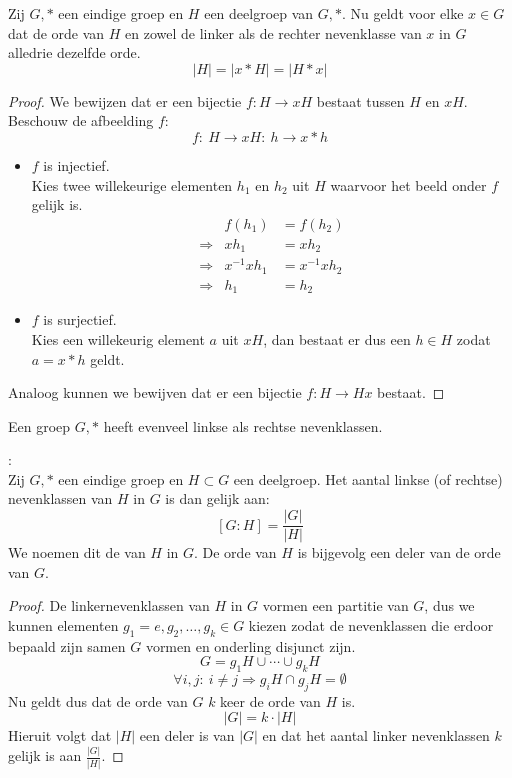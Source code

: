 \documentclass[main.tex]{subfiles}
\begin{document}
\begin{st}
  \label{st:nevenklassen-zelfde-orde}
  Zij $G,*$ een eindige groep en $H$ een deelgroep van $G,*$. Nu geldt voor elke $x\in G$ dat de orde van $H$ en zowel de linker als de rechter nevenklasse van $x$ in $G$ alledrie dezelfde orde.
  \[ |H| = |x*H| = |H*x| \]

  \begin{proof}
    We bewijzen dat er een bijectie $f: H \rightarrow xH$ bestaat tussen $H$ en $xH$.
    Beschouw de afbeelding $f$:
    \[ f:\ H\rightarrow xH:\ h \rightarrow x*h \]
    \begin{itemize}
    \item $f$ is injectief.\\
      Kies twee willekeurige elementen $h_{1}$ en $h_{2}$ uit $H$ waarvoor het beeld onder $f$ gelijk is.
      \[ 
      \begin{array}{rrl}
                  & f(h_{1})    &= f(h_{2})   \\ 
      \Rightarrow & xh_{1}      &= xh_{2}     \\
      \Rightarrow & x^{-1}xh_{1} &= x^{-1}xh_{2}\\
      \Rightarrow & h_{1}       &= h_{2}
      \end{array}
      \]
    \item $f$ is surjectief.\\
      Kies een willekeurig element $a$ uit $xH$, dan bestaat er dus een $h \in H$ zodat $a = x*h$ geldt.
    \end{itemize}
    Analoog kunnen we bewijven dat er een bijectie $f: H \rightarrow Hx$ bestaat.
  \end{proof}
\end{st}

\begin{st}
  Een groep $G,*$ heeft evenveel linkse als rechtse nevenklassen.

\end{st}

\begin{st}
  \label{st:stelling-van-lagrange}
  :\\
  Zij $G,*$ een eindige groep en $H \subset G$ een deelgroep. Het aantal linkse (of rechtse) nevenklassen van $H$ in $G$ is dan gelijk aan:
  \[ [G:H] = \frac{|G|}{|H|} \]
  We noemen dit de  van $H$ in $G$.
  De orde van $H$ is bijgevolg een deler van de orde van $G$.

  \begin{proof}
    De linkernevenklassen van $H$ in $G$ vormen een partitie van $G$, dus we kunnen elementen $g_{1} = e,g_{2},\dotsc,g_{k} \in G$ kiezen zodat de nevenklassen die erdoor bepaald zijn samen $G$ vormen en onderling disjunct zijn.
    \[ G = g_{1}H \cup \dotsb \cup g_{k}H \]
    \[ \forall i,j:\ i \neq j \Rightarrow g_{i}H \cap g_{j}H = \emptyset \]
    Nu geldt dus dat de orde van $G$ $k$ keer de orde van $H$ is.
    \[ |G| = k \cdot |H|\]
    Hieruit volgt dat $|H|$ een deler is van $|G|$ en dat het aantal linker nevenklassen $k$ gelijk is aan $\frac{|G|}{|H|}$.
  \end{proof}
\end{st}
\end{document}

